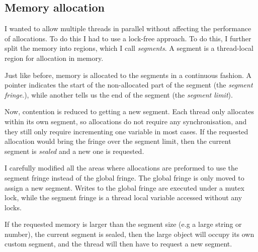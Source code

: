 


\subsection{Memory allocation}
\label{sec:malloc}
I wanted to allow multiple threads in parallel without affecting the performance
of allocations. To do this I had to use a lock-free approach. To do this, I further
split the memory into regions, which I call \emph{segments}. A segment is a thread-local region
for allocation in memory.

Just like before, memory is allocated to the segments in a continuous
fashion. A pointer indicates the start of the non-allocated part of the segment
(the \emph{segment fringe}.), while another tells us the end of the segment
(the \emph{segment limit}).

Now, contention is reduced to getting a new segment. Each thread only allocates within
its own segment, so allocations do not require any synchronisation, and they still only
require incrementing one variable in most cases. If the requested allocation would bring
the fringe over the segment limit, then the current segment is \emph{sealed} and a new one is
requested.

I carefully modified all the areas where allocations are preformed to use the segment fringe
instead of the global fringe. The global fringe is only moved to assign a new segment. Writes
to the global fringe are executed under a mutex lock, while the segment fringe is a thread local
variable accessed without any locks.

If the requested memory is larger than the segment size (e.g a large string or number),
the current segment is sealed, then the large object will occupy its own custom segment,
and the thread will then have to request a new segment.


